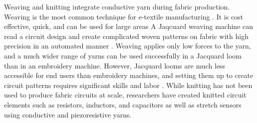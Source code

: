Weaving \cite{bonderover2004woven,dhawan2004woven1, dhawan2004woven2} and knitting \cite{farringdon1999wearable} integrate conductive yarn during fabric production.
Weaving is the most common technique for e-textile manufacturing \cite{nakad2007using}. It is cost effective, quick, and can be used for large areas
A Jaqcuard weaving machine can read a circuit design and create complicated woven patterns on fabric with high precision in an automated manner \cite{poupyrev2016project}. Weaving applies only low forces to the yarn, and a much wider range of yarns can be used successfully in a Jacquard loom than in an embroidery machine.
However, Jacquard looms are much less accessible for end users than embroidery machines, and setting them up to create circuit patterns requires significant skills and labor \cite{linz2008embroidered}. While knitting has not been used to produce fabric circuits at scale, researchers have created knitted circuit elements such as resistors, inductors, and capacitors \cite{wijesiriwardana2004fibre} as well as stretch sensors \cite{paradiso2005wearable} using conductive and piezoresistive yarns. 



